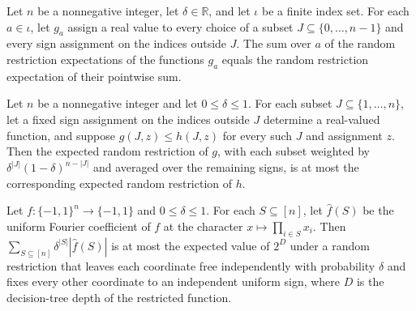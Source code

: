 \begin{theorem}
\label{FABL.sum_expectRandomRestriction}
\leanok
{}
Let $n$ be a nonnegative integer, let $\delta\in\mathbb R$, and let $\iota$ be a finite
index set. For each $a\in\iota$, let $g_a$ assign a real value to every choice of a
subset $J\subseteq\{0,\ldots,n-1\}$ and every sign assignment on the indices outside
$J$. The sum over $a$ of the random restriction expectations of the functions $g_a$
equals the random restriction expectation of their pointwise sum.
\end{theorem}

\begin{theorem}
\label{FABL.expectRandomRestriction_mono}
\leanok
{}
Let $n$ be a nonnegative integer and let $0\leq\delta\leq1$. For each subset
$J\subseteq\{1,\ldots,n\}$, let a fixed sign assignment on the indices outside $J$
determine a real-valued function, and suppose $g(J,z)\leq h(J,z)$ for every such $J$ and
assignment $z$. Then the expected random restriction of $g$, with each subset weighted
by $\delta^{|J|}(1-\delta)^{n-|J|}$ and averaged over the remaining signs, is at most
the corresponding expected random restriction of $h$.
\end{theorem}

\begin{theorem}
\label{FABL.lemma4_23}
\leanok
{}
Let $f:\{-1,1\}^n\to\{-1,1\}$ and $0\leq\delta\leq1$. For each $S\subseteq[n]$, let
$\widehat f(S)$ be the uniform Fourier coefficient of $f$ at the character
$x\mapsto\prod_{i\in S}x_i$. Then $\sum_{S\subseteq[n]}\delta^{|S|}|\widehat f(S)|$ is
at most the expected value of $2^D$ under a random restriction that leaves each
coordinate free independently with probability $\delta$ and fixes every other coordinate
to an independent uniform sign, where $D$ is the decision-tree depth of the restricted
function.
\end{theorem}

